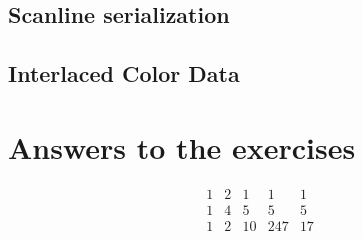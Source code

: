 \subsection{Scanline serialization}

\subsection{Interlaced Color Data}
\label{png-interlacing}

\section{Answers to the exercises}

\begin{Answer}[ref={filter-1}]

\[
 \begin{matrix}
  1 & 2 & 1 & 1 & 1 \\
  1 & 4 & 5 & 5 & 5 \\
  1 & 2 & 10 & 247 & 17
 \end{matrix}
\]


\end{Answer}


